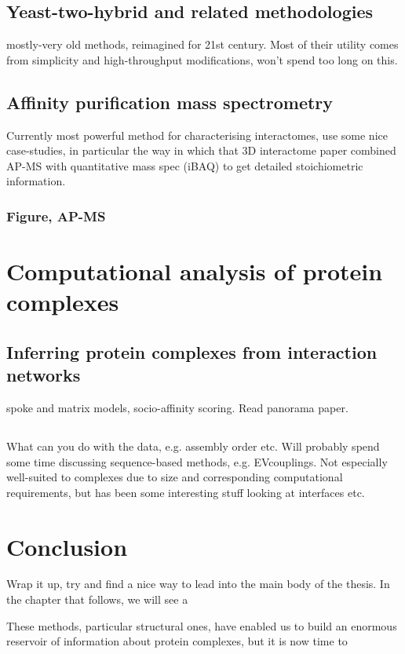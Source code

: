 \documentclass[a4paper,11pt,twoside,openright]{scrbook}
\let\cite\supercite
\begin{document}
\subsection{Yeast-two-hybrid and related methodologies}
mostly-very old methods, reimagined for 21st century. Most of their utility comes from simplicity and high-throughput modifications, won't spend too long on this.

\subsection{Affinity purification mass spectrometry}
Currently most powerful method for characterising interactomes, use some nice case-studies, in particular the way in which that 3D interactome paper \cite{Hein2015} combined AP-MS with quantitative mass spec (iBAQ) to get detailed stoichiometric information.


\subsubsection{Figure, AP-MS}

\section{Computational analysis of protein complexes}
\subsection{Inferring protein complexes from interaction networks}
spoke and matrix models, socio-affinity scoring. Read panorama paper. \cite{Wan2015}
\subsection{}
What can you do with the data, e.g. assembly order etc. Will probably spend some time discussing sequence-based methods, e.g. EVcouplings. Not especially well-suited to complexes due to size and corresponding computational requirements, but has been some interesting stuff looking at interfaces etc.

\section{Conclusion}
Wrap it up, try and find a nice way to lead into the main body of the thesis. In the chapter that follows, we will see a

These methods, particular structural ones, have enabled us to build an enormous reservoir of information about protein complexes, but it is now time to

\printbibliography
\end{document}
